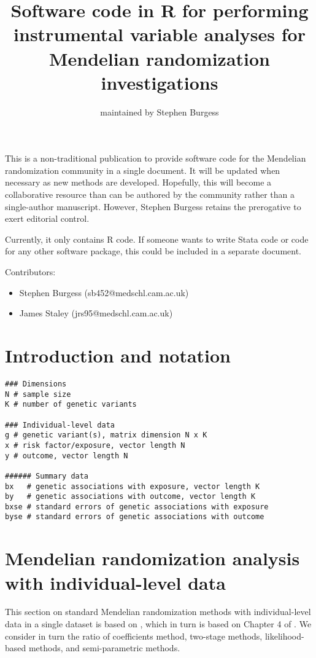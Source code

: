 \documentclass[a4paper,12pt]{article} %
\begin{document}
\title{Software code in R for performing instrumental variable analyses for Mendelian randomization investigations}
\author{maintained by Stephen Burgess}
\maketitle
This is a non-traditional publication to provide software code for the Mendelian randomization community in a single document. It will be updated when necessary as new methods are developed. Hopefully, this will become a collaborative resource than can be authored by the community rather than a single-author manuscript. However, Stephen Burgess retains the prerogative to exert editorial control.

Currently, it only contains R code. If someone wants to write Stata code or code for any other software package, this could be included in a separate document.

Contributors: 
\begin{itemize}
\item Stephen Burgess (sb452@medschl.cam.ac.uk)
\item James Staley (jrs95@medschl.cam.ac.uk)
\end{itemize}

\clearpage

\tableofcontents %

\clearpage

\section{Introduction and notation}
\begin{lstlisting}
### Dimensions
N # sample size
K # number of genetic variants

### Individual-level data
g # genetic variant(s), matrix dimension N x K
x # risk factor/exposure, vector length N
y # outcome, vector length N

###### Summary data
bx   # genetic associations with exposure, vector length K
by   # genetic associations with outcome, vector length K
bxse # standard errors of genetic associations with exposure
byse # standard errors of genetic associations with outcome
\end{lstlisting}

\clearpage

\section{Mendelian randomization analysis with individual-level data}
This section on standard Mendelian randomization methods with individual-level data in a single dataset is based on \cite{burgess2015review}, which in turn is based on Chapter 4 of \cite{burgess2015book}. We consider in turn the ratio of coefficients method, two-stage methods, likelihood-based methods, and semi-parametric methods.
\end{document}
